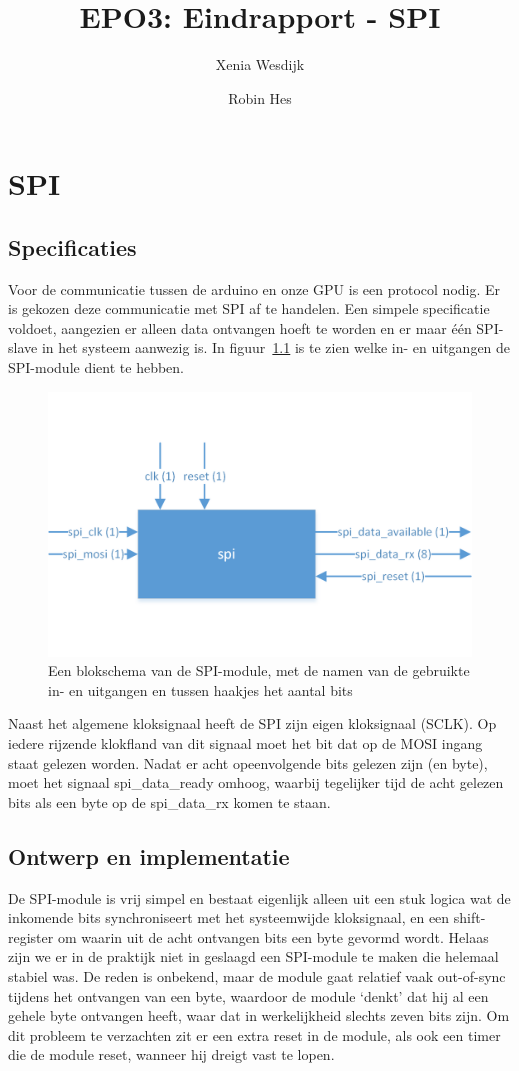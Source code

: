 \documentclass{scrartcl} %
\author{Xenia Wesdijk \and Robin Hes}
\title{EPO3: Eindrapport - SPI}
\begin{document}
\chapter{SPI}
\label{ch:spi}

\section{Specificaties}
Voor de communicatie tussen de arduino en onze GPU is een protocol nodig. Er is gekozen deze communicatie met SPI af te handelen. Een simpele specificatie voldoet, aangezien er alleen data ontvangen hoeft te worden en er maar één SPI-slave in het systeem aanwezig is. In figuur~\ref{fig:spi-schema} is te zien welke in- en uitgangen de SPI-module dient te hebben.

\begin{figure}[H]
	\centering
	\includegraphics[width=\textwidth]{resource/spi.png}
	\caption{Een blokschema van de SPI-module, met de namen van de gebruikte in- en uitgangen en tussen haakjes het aantal bits}
	\label{fig:spi-schema}
\end{figure}

Naast het algemene kloksignaal heeft de SPI zijn eigen kloksignaal (SCLK). Op iedere rijzende klokfland van dit signaal moet het bit dat op de MOSI ingang staat gelezen worden. Nadat er acht opeenvolgende bits gelezen zijn (en byte), moet het signaal spi\_data\_ready omhoog, waarbij tegelijker tijd de acht gelezen bits als een byte op de spi\_data\_rx komen te staan.

\section{Ontwerp en implementatie}
De SPI-module is vrij simpel en bestaat eigenlijk alleen uit een stuk logica wat de inkomende bits synchroniseert met het systeemwijde kloksignaal, en een shift-register om waarin uit de acht ontvangen bits een byte gevormd wordt. Helaas zijn we er in de praktijk niet in geslaagd een SPI-module te maken die helemaal stabiel was. De reden is onbekend, maar de module gaat relatief vaak out-of-sync tijdens het ontvangen van een byte, waardoor de module `denkt' dat hij al een gehele byte ontvangen heeft, waar dat in werkelijkheid slechts zeven bits zijn. Om dit probleem te verzachten zit er een extra reset in de module, als ook een timer die de module reset, wanneer hij dreigt vast te lopen.
\end{document}

